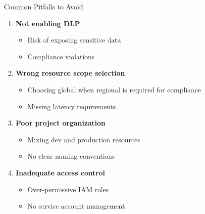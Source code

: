 \documentclass[aspectratio=169]{beamer}
\begin{document}
\begin{frame}{Common Pitfalls to Avoid}
    \begin{enumerate}
        \item[\textcolor{googlered}{\faBan}] \textbf{Not enabling DLP}
        \begin{itemize}
            \item Risk of exposing sensitive data
            \item Compliance violations
        \end{itemize}
        
        \item[\textcolor{googlered}{\faBan}] \textbf{Wrong resource scope selection}
        \begin{itemize}
            \item Choosing global when regional is required for compliance
            \item Missing latency requirements
        \end{itemize}
        
        \item[\textcolor{googlered}{\faBan}] \textbf{Poor project organization}
        \begin{itemize}
            \item Mixing dev and production resources
            \item No clear naming conventions
        \end{itemize}
        
        \item[\textcolor{googlered}{\faBan}] \textbf{Inadequate access control}
        \begin{itemize}
            \item Over-permissive IAM roles
            \item No service account management
        \end{itemize}
    \end{enumerate}
    
    \begin{center}
    \end{center}
\end{frame}
\end{document}
